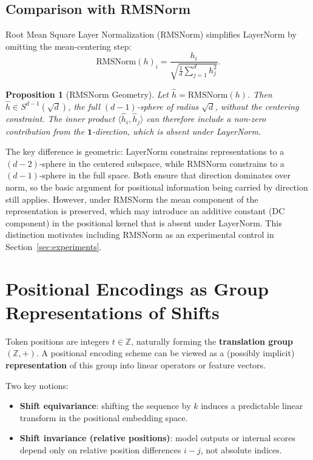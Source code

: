 \documentclass[11pt]{article}
\newtheorem{proposition}[theorem]{Proposition}
\theoremstyle{definition}
\begin{document}
\subsection{Comparison with RMSNorm}

Root Mean Square Layer Normalization (RMSNorm) \cite{zhang2019rmsnorm} simplifies LayerNorm by omitting the mean-centering step:
\[
\mathrm{RMSNorm}(h)_i = \frac{h_i}{\sqrt{\frac{1}{d}\sum_{j=1}^d h_j^2}}.
\]

\begin{proposition}[RMSNorm Geometry]
\label{prop:rmsnorm-geometry}
Let $\hat{h} = \mathrm{RMSNorm}(h)$. Then $\hat{h} \in S^{d-1}(\sqrt{d})$, the full $(d-1)$-sphere of radius $\sqrt{d}$, without the centering constraint. The inner product $\langle \hat{h}_i, \hat{h}_j \rangle$ can therefore include a non-zero contribution from the $\mathbf{1}$-direction, which is absent under LayerNorm.
\end{proposition}

The key difference is geometric: LayerNorm constrains representations to a $(d-2)$-sphere in the centered subspace, while RMSNorm constrains to a $(d-1)$-sphere in the full space. Both ensure that direction dominates over norm, so the basic argument for positional information being carried by direction still applies. However, under RMSNorm the mean component of the representation is preserved, which may introduce an additive constant (DC component) in the positional kernel that is absent under LayerNorm. This distinction motivates including RMSNorm as an experimental control in Section~\ref{sec:experiments}.

\section{Positional Encodings as Group Representations of Shifts}

Token positions are integers \(t \in \mathbb{Z}\), naturally forming the \textbf{translation group} \((\mathbb{Z}, +)\). A positional encoding scheme can be viewed as a (possibly implicit) \textbf{representation} of this group into linear operators or feature vectors.

Two key notions:

\begin{itemize}
    \item \textbf{Shift equivariance}: shifting the sequence by \(k\) induces a predictable linear transform in the positional embedding space.
    \item \textbf{Shift invariance (relative positions)}: model outputs or internal scores depend only on relative position differences \(i-j\), not absolute indices.
\end{itemize}
\end{document}
